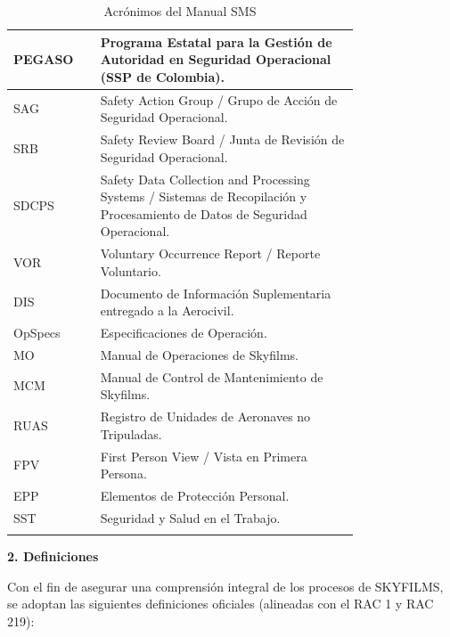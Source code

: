 \begin{longtable}{|>{\centering\arraybackslash}m{0.17\linewidth}|m{0.6\linewidth}|}
PEGASO & Programa Estatal para la Gestión de Autoridad en Seguridad Operacional (SSP de Colombia). \\ \hline
SAG & Safety Action Group / Grupo de Acción de Seguridad Operacional. \\ \hline
SRB & Safety Review Board / Junta de Revisión de Seguridad Operacional. \\ \hline
SDCPS & Safety Data Collection and Processing Systems / Sistemas de Recopilación y Procesamiento de Datos de Seguridad Operacional. \\ \hline
VOR & Voluntary Occurrence Report / Reporte Voluntario. \\ \hline
DIS & Documento de Información Suplementaria entregado a la Aerocivil. \\ \hline
OpSpecs & Especificaciones de Operación. \\ \hline
MO & Manual de Operaciones de Skyfilms. \\ \hline
MCM & Manual de Control de Mantenimiento de Skyfilms. \\ \hline
RUAS & Registro de Unidades de Aeronaves no Tripuladas. \\ \hline
FPV & First Person View / Vista en Primera Persona. \\ \hline
EPP & Elementos de Protección Personal. \\ \hline
SST & Seguridad y Salud en el Trabajo. \\ \hline

\caption{Acrónimos del Manual SMS}
\label{tab:Acronimos}
\end{longtable}

\textbf{2. Definiciones}

Con el fin de asegurar una comprensión integral de los procesos de SKYFILMS, se adoptan las siguientes definiciones oficiales (alineadas con el RAC 1 y RAC 219):

